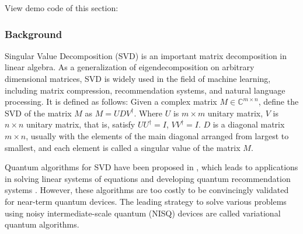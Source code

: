 View demo code of this section:  \ 

\subsubsection{Background}
Singular Value Decomposition (SVD) is an important matrix decomposition in linear algebra. As a generalization of eigendecomposition on arbitrary dimensional matrices, SVD is widely used in the field of machine learning, including matrix compression, recommendation systems, and natural language processing. It is defined as follows:
Given a complex matrix $M \in \mathbb{C}^{m \times n}$, define the SVD of the matrix $M$ as $M = UDV^\dagger$. Where $U$ is $m \times m$ unitary matrix, $V$ is $n \times n$ unitary matrix, that is, satisfy $UU^\dagger = I$, $VV^\dagger = I$. $D$ is a diagonal matrix $m \times n$, usually with the elements of the main diagonal arranged from largest to smallest, and each element is called a singular value of the matrix $M$.


Quantum algorithms for SVD have been proposed in \cite{kerenidis2016quantum, rebentrost2018quantum}, which leads to applications in solving linear systems of equations \cite{wossnig2018quantum} and developing quantum recommendation systems \cite{kerenidis2016quantum}. However, these algorithms are too costly to be convincingly validated for near-term quantum devices. The leading strategy to solve various problems using noisy intermediate-scale quantum (NISQ) devices are called variational quantum algorithms.

